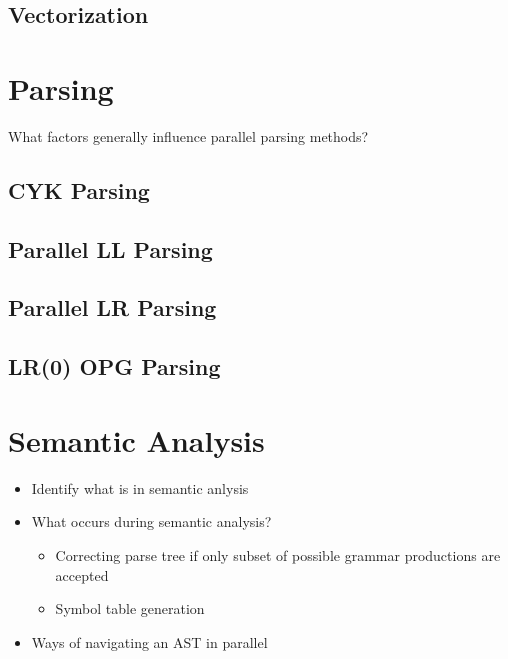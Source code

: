 \subsection{Vectorization}
\cite{wang_hyperscan_2019}

\section{Parsing} \label{lit_review_parsing}
\begin{sectionplan}
    What factors generally influence parallel parsing methods?
\end{sectionplan}
\cite{mark_thierry_vandevoorde_parallel_1988}

\subsection{CYK Parsing}
\cite{skrzypczak_parallel_nodate}
\subsection{Parallel LL Parsing}
\cite{robin_voetter_parallel_2021}
\subsection{Parallel LR Parsing}
\cite{clarke_error_1993}
\subsection{LR(0) OPG Parsing}
\cite{barenghi_parallel_2015, li_associative_2023}

\section{Semantic Analysis} \label{lit_review_analysis}
\begin{sectionplan}
    \begin{itemize}
        \item Identify what is in semantic anlysis
        \item What occurs during semantic analysis?
        \begin{itemize}
            \item Correcting parse tree if only subset of possible grammar productions are accepted
            \item Symbol table generation
        \end{itemize}
        \item Ways of navigating an AST in parallel
    \end{itemize}
\end{sectionplan}
